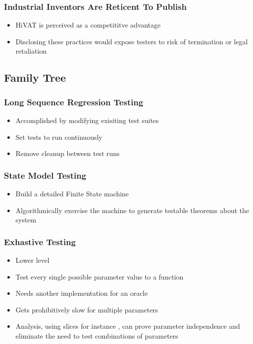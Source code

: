 \begin{frame}
  \frametitle{Industrial Inventors Are Reticent To Publish}
  \begin{itemize}
    \item HiVAT is perceived as a competititve advantage
    \item Disclosing these practices would expose testers to risk of termination or legal retaliation
  \end{itemize}
\end{frame}

\subsection{Family Tree}

\begin{frame}
  \frametitle{Long Sequence Regression Testing}
  \begin{itemize}
    \item Accomplished by modifying exisiting test suites
    \item Set tests to run continuously
    \item Remove cleanup between test runs
  \end{itemize}
\end{frame}

\begin{frame}
  \frametitle{State Model Testing}
  \begin{itemize}
    \item Build a detailed Finite State machine
    \item Algorithmically exercise the machine to generate testable theorems about the system
  \end{itemize}
\end{frame}

\begin{frame}
  \frametitle{Exhastive Testing}
  \begin{itemize}
    \item Lower level
    \item Test every single possible parameter value to a function
    \item Needs another implementation for an oracle
    \item Gets prohibitively slow for multiple parameters
    \item Analysis, using slices for instance \citep{gallagher1991using}, can prove parameter independence and eliminate the need to test combinations of parameters
  \end{itemize}
\end{frame}


